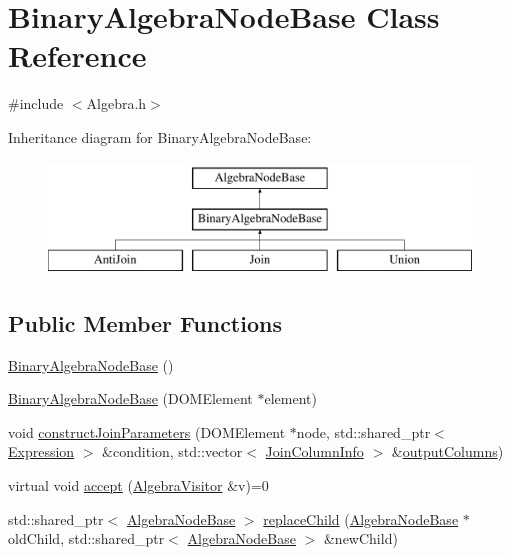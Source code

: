 \hypertarget{class_binary_algebra_node_base}{\section{Binary\+Algebra\+Node\+Base Class Reference}
\label{class_binary_algebra_node_base}
}


{\ttfamily \#include $<$Algebra.\+h$>$}

Inheritance diagram for Binary\+Algebra\+Node\+Base\+:\begin{figure}[H]
\begin{center}
\leavevmode
\includegraphics[height=3.000000cm]{class_binary_algebra_node_base}
\end{center}
\end{figure}
\subsection*{Public Member Functions}
\begin{DoxyCompactItemize}
\item 
\hyperlink{class_binary_algebra_node_base_a86e98adfda4ff8d492a9600de4f37100}{Binary\+Algebra\+Node\+Base} ()
\item 
\hyperlink{class_binary_algebra_node_base_a0a44a290bb4c433b83f58d948240a0d0}{Binary\+Algebra\+Node\+Base} (D\+O\+M\+Element $\ast$element)
\item 
void \hyperlink{class_binary_algebra_node_base_a266f8e4526337e86f97ebeabb326be22}{construct\+Join\+Parameters} (D\+O\+M\+Element $\ast$node, std\+::shared\+\_\+ptr$<$ \hyperlink{class_expression}{Expression} $>$ \&condition, std\+::vector$<$ \hyperlink{class_join_column_info}{Join\+Column\+Info} $>$ \&\hyperlink{class_algebra_node_base_ac59c590aea4f109c7fab18f714c588c1}{output\+Columns})
\item 
virtual void \hyperlink{class_binary_algebra_node_base_ab6521a638b418e4f0939270bab77b901}{accept} (\hyperlink{class_algebra_visitor}{Algebra\+Visitor} \&v)=0
\item 
std\+::shared\+\_\+ptr$<$ \hyperlink{class_algebra_node_base}{Algebra\+Node\+Base} $>$ \hyperlink{class_binary_algebra_node_base_a6e466b62966a9851c3c34e1fb588a496}{replace\+Child} (\hyperlink{class_algebra_node_base}{Algebra\+Node\+Base} $\ast$old\+Child, std\+::shared\+\_\+ptr$<$ \hyperlink{class_algebra_node_base}{Algebra\+Node\+Base} $>$ \&new\+Child)
\end{DoxyCompactItemize}

